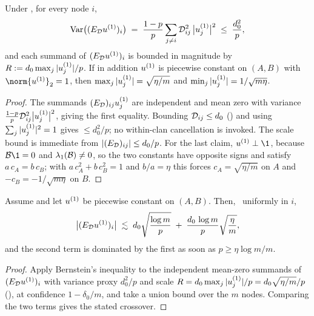 \begin{lemma}\label{lem:dist-var}
Under , for every node $i$,
\begin{equation}\label{eq:dist-var}
   \operatorname{Var}\bigl((E_{\mathcal{D}}u^{(1)})_i\bigr)
   \;=\;\frac{1-p}{p}\sum_{j\ne i}\mathcal{D}_{ij}^2\,\bigl|u^{(1)}_j\bigr|^{2}
   \;\le\;\frac{d_0^{2}}{p},
\end{equation}
and each summand of $(E_{\mathcal{D}}u^{(1)})_i$ is bounded in magnitude by
$R:=d_0\max_j|u^{(1)}_j|/p$. If in addition $u^{(1)}$ is piecewise constant on
$(A,B)$ with $\norm{\uone}_2=1$, then $\max_j|u^{(1)}_j|=\sqrt{\eta/m}$ and
$\min_j|u^{(1)}_j|=1/\sqrt{m\eta}$.
\end{lemma}
\begin{proof}
The summands $(E_{\mathcal{D}})_{ij}u^{(1)}_j$ are independent and mean zero with
variance $\tfrac{1-p}{p}\mathcal{D}_{ij}^2\bigl|u^{(1)}_j\bigr|^2$, giving the first equality.
Bounding $\mathcal{D}_{ij}\le d_0$ () and using
$\sum_j|u^{(1)}_j|^2=1$ gives $\le d_0^2/p$; no within-clan cancellation is invoked.
The scale bound is immediate from $|(E_{\mathcal{D}})_{ij}|\le d_0/p$. For the last
claim, $\uone\perp\1$, because $\Bop\1=0$ and $\lambda_1(\mathcal{B})\ne0$, so the two
constants have opposite signs and satisfy $a\,c_A=b\,c_B$; with
$a\,c_A^2+b\,c_B^2=1$ and $b/a=\eta$ this forces $c_A=\sqrt{\eta/m}$ on $A$ and
$-c_B=-1/\sqrt{m\eta}$ on $B$.
\end{proof}

\begin{lemma}\label{lem:dist-pernode}
Assume  and let $u^{(1)}$ be piecewise constant
on $(A,B)$. Then, \hp\ uniformly in $i$,
\begin{equation}\label{eq:dist-pernode-bound}
   \bigl|(E_{\mathcal{D}}u^{(1)})_i\bigr|
   \;\lesssim\; d_0\sqrt{\frac{\log m}{p}}
              \;+\; \frac{d_0\,\log m}{p}\sqrt{\frac{\eta}{m}} ,
\end{equation}
and the second term is dominated by the first as soon as $p\ge\eta\log m/m$.
\end{lemma}
\begin{proof}
Apply Bernstein's inequality to the independent mean-zero summands of
$(E_{\mathcal{D}}u^{(1)})_i$ with variance proxy $d_0^2/p$ and scale
$R=d_0\max_j|u^{(1)}_j|/p=d_0\sqrt{\eta/m}/p$ (), at confidence
$1-\delta_0/m$, and take a union bound over the $m$ nodes. Comparing the two terms
gives the stated crossover.
\end{proof}

